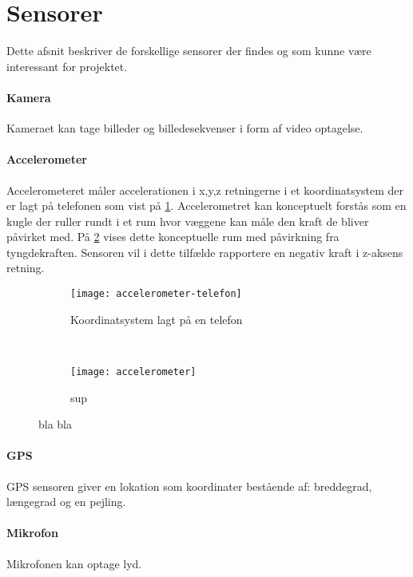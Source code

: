 \section{Sensorer}
Dette afsnit beskriver de forskellige sensorer der findes og som kunne være interessant for projektet. 

\paragraph{Kamera}
Kameraet kan tage billeder og billedesekvenser i form af video optagelse.

\paragraph{Accelerometer}
Accelerometeret måler accelerationen i x,y,z retningerne i et koordinatsystem der er lagt på telefonen som vist på \cref{analyse:accelerometer:koo}.
Accelerometret kan konceptuelt forstås som en kugle der ruller rundt i et rum hvor væggene kan måle den kraft de bliver påvirket med.
På \cref{analyse:accelerometer:kraft} vises dette konceptuelle rum med påvirkning fra tyngdekraften. 
Sensoren vil i dette tilfælde rapportere en negativ kraft i z-aksens retning.

\begin{figure}[h]
	\centering
	\begin{subfigure}[b]{0.47\textwidth}
		\centering
		\texttt{[image: accelerometer-telefon]}
		\caption{Koordinatsystem lagt på en telefon}
		\label{analyse:accelerometer:koo}
	\end{subfigure}
	~
	\begin{subfigure}[b]{0.47\textwidth}
		\centering
		\texttt{[image: accelerometer]}
		\caption{sup}
		\label{analyse:accelerometer:kraft}
	\end{subfigure}
	\caption{bla bla}
	\label{accelerometer}
\end{figure} 

\paragraph{GPS}
GPS sensoren giver en lokation som koordinater bestående af: breddegrad, længegrad og en pejling.

\paragraph{Mikrofon}
Mikrofonen kan optage lyd.


